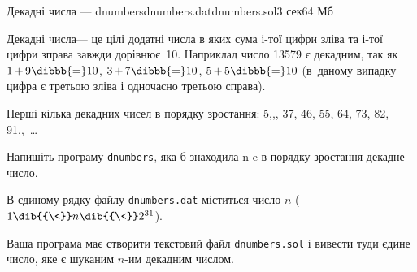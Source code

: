 \begin{problem}{Декадні числа --- dnumbers}{dnumbers.dat}{dnumbers.sol}{3 сек}{64 Мб}

Декадні числа\nolinebreak[3] --- це цілі додатні числа в яких сума \mbox{$і$-тої} цифри зліва та \mbox{$і$-тої} цифри зправа завжди дорівнює~10. Наприклад число 13579 є декадним, так як 
${1\,{+}\,9}\dibbb{{=}}10$,\hspace{0.5em plus 0.5em} 
${3\,{+}\,7}\dibbb{{=}}10$,\hspace{0.5em plus 0.5em} 
${5\,{+}\,5}\dibbb{{=}}10$
(в~даному випадку цифра є третьою зліва і одночасно третьою справа).

Перші кілька декадних чисел в порядку зростання:
5,,, 37, 46, 55, 64, 73, 82, 91,,~\dots

\Task
Напишіть програму \texttt{dnumbers}, яка б знаходила n-e в порядку зростання декадне число.

\InputFile
В єдиному рядку файлу \texttt{dnumbers.dat} міститься число $n$ ($1\dib{{\<}}n\dib{{\<}}2^{31}$).

\OutputFile
Ваша програма має створити текстовий файл \texttt{dnumbers.sol} і вивести туди єдине число, яке є шуканим \mbox{$n$-им} декадним числом.


\Examples
\hspace{-1em}
\begin{exampleWidthsAndDefaultFileNames}{2em}{2em}%
%
\end{exampleWidthsAndDefaultFileNames}
\hspace{-1.75em}
\begin{exampleWidthsAndDefaultFileNames}{2em}{2em}%
%
\end{exampleWidthsAndDefaultFileNames}
\hspace*{-1em}


\end{problem}
